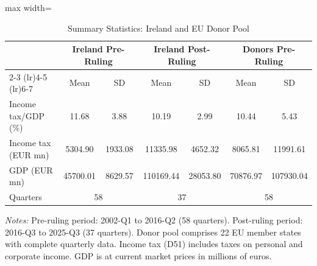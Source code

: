 \begin{table}[H]
\centering
\caption{Summary Statistics: Ireland and EU Donor Pool}
\label{tab:summary}
\begin{threeparttable}
\begin{adjustbox}{max width=\textwidth}
\begin{tabular}{lcccccc}
\toprule
 & \multicolumn{2}{c}{Ireland Pre-Ruling} & \multicolumn{2}{c}{Ireland Post-Ruling} & \multicolumn{2}{c}{Donors Pre-Ruling} \\
\cmidrule(lr){2-3} \cmidrule(lr){4-5} \cmidrule(lr){6-7}
 & Mean & SD & Mean & SD & Mean & SD \\
\midrule
    Income tax/GDP (\%) & 11.68 & 3.88 & 10.19 & 2.99 & 10.44 & 5.43 \\
    Income tax (EUR mn) & 5304.90 & 1933.08 & 11335.98 & 4652.32 & 8065.81 & 11991.61 \\
    GDP (EUR mn) & 45700.01 & 8629.57 & 110169.44 & 28053.80 & 70876.97 & 107930.04 \\
    Quarters & \multicolumn{2}{c}{58} & \multicolumn{2}{c}{37} & \multicolumn{2}{c}{58} \\
\bottomrule
\end{tabular}
\end{adjustbox}
\begin{tablenotes}[flushleft]
\small
\item \textit{Notes:} Pre-ruling period: 2002-Q1 to 2016-Q2 (58 quarters). Post-ruling period: 2016-Q3 to 2025-Q3 (37 quarters). Donor pool comprises 22 EU member states with complete quarterly data. Income tax (D51) includes taxes on personal and corporate income. GDP is at current market prices in millions of euros.
\end{tablenotes}
\end{threeparttable}
\end{table}
